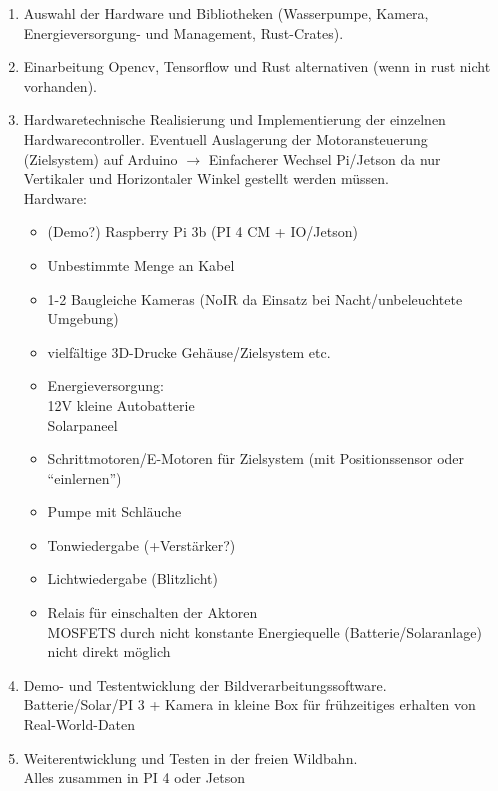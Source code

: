 

\begin{enumerate}
    \item Auswahl der Hardware und Bibliotheken (Wasserpumpe, Kamera, Energieversorgung- und Management, Rust-Crates).
    \item Einarbeitung Opencv, Tensorflow und Rust alternativen (wenn in rust nicht vorhanden).
    \item Hardwaretechnische Realisierung und Implementierung der einzelnen Hardwarecontroller.
            Eventuell Auslagerung der Motoransteuerung (Zielsystem) auf Arduino $\rightarrow$
            Einfacherer Wechsel Pi/Jetson da nur Vertikaler und Horizontaler Winkel
            gestellt werden müssen.\\
            Hardware:
            \begin{itemize}
                \item (Demo?) Raspberry Pi 3b (PI 4 CM + IO/Jetson)
                \item Unbestimmte Menge an Kabel
                \item 1-2 Baugleiche Kameras (NoIR da Einsatz bei Nacht/unbeleuchtete Umgebung)
                \item vielfältige 3D-Drucke Gehäuse/Zielsystem etc.
                \item Energieversorgung:\\
                    12V kleine Autobatterie\\
                    Solarpaneel
                \item Schrittmotoren/E-Motoren für Zielsystem (mit Positionssensor oder "`einlernen"')
                \item Pumpe mit Schläuche
                \item Tonwiedergabe (+Verstärker?)
                \item Lichtwiedergabe (Blitzlicht)
                \item Relais für einschalten der Aktoren
                \\ MOSFETS durch nicht konstante Energiequelle (Batterie/Solaranlage) nicht direkt möglich
            \end{itemize}
    \item Demo- und Testentwicklung der Bildverarbeitungssoftware.
    \\ Batterie/Solar/PI 3 + Kamera in kleine Box für frühzeitiges erhalten von Real-World-Daten
    \item Weiterentwicklung und Testen in der freien Wildbahn.
    \\ Alles zusammen in PI 4 oder Jetson
\end{enumerate}

